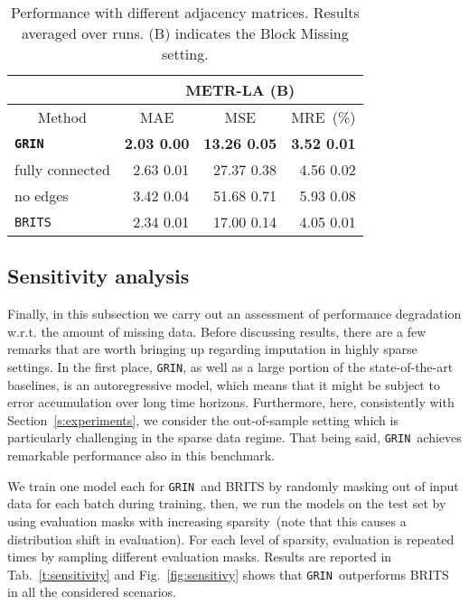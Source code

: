 \documentclass{article} \usepackage{iclr2022_conference,times}
\newcommand{\GRIL}{\texttt{GRIN}}
\begin{document}
\begin{table}[ht]
\vspace{-0.2cm}
\caption{Performance with  different adjacency matrices. Results averaged over  runs. (B) indicates the Block Missing setting.}
\vspace{0.1cm}
\centering
\begin{tabular}{ l | r | r | r }
\toprule
\multicolumn{1}{c}{} & \multicolumn{3}{c}{METR-LA (B)}\\
\midrule
 \multicolumn{1}{c}{Method}&\multicolumn{1}{|c}{MAE} & \multicolumn{1}{|c}{MSE} & \multicolumn{1}{|c}{MRE~(\%)} \\
\midrule
\texttt{\textbf{\GRIL}}  & \textbf{2.03 {\tiny  0.00}} & \textbf{13.26 {\tiny  0.05}} & \textbf{3.52 {\tiny  0.01}} \\
\midrule[0.3pt]
fully connected & 2.63 {\tiny  0.01} & 27.37 {\tiny  0.38} & 4.56 {\tiny  0.02}\\
no edges & 3.42 {\tiny  0.04} & 51.68 {\tiny  0.71} & 5.93 {\tiny  0.08}\\
\midrule

\texttt{BRITS} & 2.34 {\tiny  0.01} & 17.00 {\tiny  0.14} & 4.05 {\tiny  0.01}\\
\bottomrule
\end{tabular}
\label{t:graph_ablation}
\end{table} 
\subsection{Sensitivity analysis}

Finally, in this subsection we carry out an assessment of performance degradation w.r.t. the amount of missing data. Before discussing results, there are a few remarks that are worth bringing up regarding imputation in highly sparse settings. In the first place, \GRIL, as well as a large portion of the state-of-the-art baselines, is an autoregressive model, which means that it might be subject to error accumulation over long time horizons. Furthermore, here, consistently with Section~\ref{s:experiments}, we consider the out-of-sample setting which is particularly challenging in the sparse data regime. That being said, \GRIL\  achieves remarkable performance also in this benchmark.

We train one model each for \GRIL\ and BRITS by randomly masking out  of input data for each batch during training, then, we run the models on the test set by using evaluation masks with increasing sparsity~(note that this causes a distribution shift in evaluation). For each level of sparsity, evaluation is repeated  times by sampling different evaluation masks. Results are reported in Tab.~\ref{t:sensitivity} and Fig.~\ref{fig:sensitivy} shows that \GRIL\ outperforms BRITS in all the considered scenarios.
\end{document}

